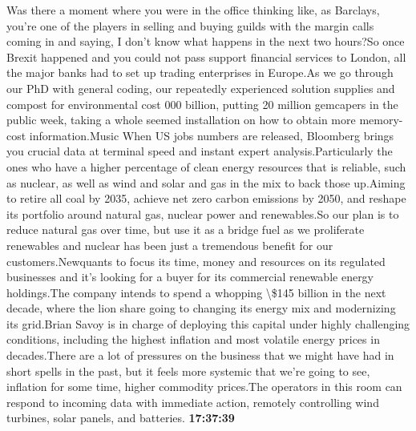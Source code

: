 \documentclass{article}%
\begin{document}
Was there a moment where you were in the office thinking like, as Barclays, you're one of the players in selling and buying guilds with the margin calls coming in and saying, I don't know what happens in the next two hours?So once Brexit happened and you could not pass support financial services to London, all the major banks had to set up trading enterprises in Europe.As we go through our PhD with general coding, our repeatedly experienced solution supplies and compost for environmental cost 000 billion, putting 20 million gemcapers in the public week, taking a whole seemed installation on how to obtain more memory{-}cost information.Music When US jobs numbers are released, Bloomberg brings you crucial data at terminal speed and instant expert analysis.Particularly the ones who have a higher percentage of clean energy resources that is reliable, such as nuclear, as well as wind and solar and gas in the mix to back those up.Aiming to retire all coal by 2035, achieve net zero carbon emissions by 2050, and reshape its portfolio around natural gas, nuclear power and renewables.So our plan is to reduce natural gas over time, but use it as a bridge fuel as we proliferate renewables and nuclear has been just a tremendous benefit for our customers.Newquants to focus its time, money and resources on its regulated businesses and it's looking for a buyer for its commercial renewable energy holdings.The company intends to spend a whopping \textbackslash{}\$145 billion in the next decade, where the lion share going to changing its energy mix and modernizing its grid.Brian Savoy is in charge of deploying this capital under highly challenging conditions, including the highest inflation and most volatile energy prices in decades.There are a lot of pressures on the business that we might have had in short spells in the past, but it feels more systemic that we're going to see, inflation for some time, higher commodity prices.The operators in this room can respond to incoming data with immediate action, remotely controlling wind turbines, solar panels, and batteries.%
\textbf{17:37:39}%
\newline%
\end{document}
